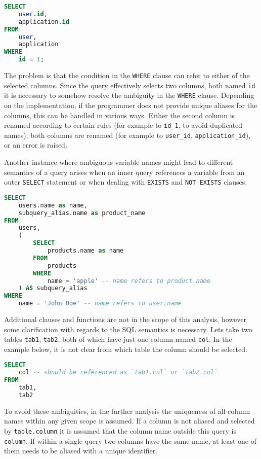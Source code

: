 \documentclass[magisterska,en]{pracamgr}
\newcommand{\code}[1]{\texttt{#1}}
\begin{document}
\begin{lstlisting}[language=SQL]
SELECT
    user.id,
    application.id
FROM
    user,
    application
WHERE
    id = 1;
\end{lstlisting}

The problem is that the condition in the \code{WHERE} clause can refer to either of the selected columns. Since the query effectively selects two columns, both named \code{id} it is necessary to somehow resolve the ambiguity in the \code{WHERE} clause. Depending on the implementation, if the programmer does not provide unique aliases for the columns, this can be handled in various ways. Either the second column is renamed according to certain rules (for example to \code{id_1}, to avoid duplicated names), both columns are renamed (for example to \code{user_id}, \code{application_id}), or an error is raised.

Another instance where ambiguous variable names might lead to different semantics of a query arises when an inner query references a variable from an outer \code{SELECT} statement or when dealing with \code{EXISTS} and \code{NOT EXISTS} clauses.

\begin{lstlisting}[language=SQL, caption=Variable shadowing]
SELECT
    users.name as name,
    subquery_alias.name as product_name
FROM
    users,
    (
        SELECT
            products.name as name
        FROM
            products
        WHERE
            name = 'apple' -- name refers to product.name
    ) AS subquery_alias
WHERE
    name = 'John Doe' -- name refers to user.name
\end{lstlisting}

Additional clauses and functions are not in the scope of this analysis, however some clarification with regards to the SQL semantics is necessary. Lets take two tables \code{tab1}, \code{tab2}, both of which have just one column named \code{col}. In the example below, it is not clear from which table the column should be selected.

\begin{lstlisting}[language=SQL]
SELECT
    col -- should be referenced as `tab1.col` or `tab2.col`
FROM
    tab1,
    tab2
\end{lstlisting}

To avoid these ambiguities, in the further analysis the uniqueness of all column names within any given scope is assumed. If a column is not aliased and selected by \code{table.column} it is assumed that the column name outside this query is \code{column}. If within a single query two columns have the same name, at least one of them needs to be aliased with a unique identifier.
\end{document}
